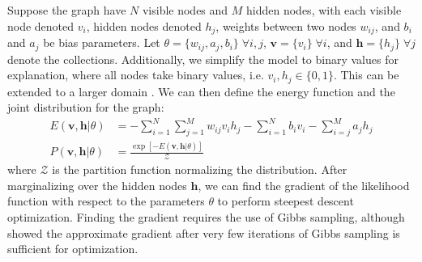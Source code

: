 \documentclass[12pt]{article}
\newcommand{\de}{\partial}
\begin{document}
Suppose the graph have $N$ visible nodes and $M$ hidden nodes,
with each visible node denoted $v_i$, hidden nodes denoted $h_j$, 
weights between two nodes $w_{ij}$,
and $b_i$ and $a_j$ be bias parameters.
Let $\theta = \{ w_{ij},a_j,b_i \} \; \forall i,j$,
$\mathbf{v} = \{v_i\} \; \forall i$,
and $\mathbf{h} = \{h_j\} \; \forall j$ denote the collections.
Additionally, we simplify the model to binary values for explanation, 
where all nodes take binary values, i.e. $v_i, h_j \in \{0,1\}$.
This can be extended to a larger domain \cite{SaMnHi07}.
We can then define the energy function and 
the joint distribution for the graph:
%
\begin{equation}
\begin{aligned}
    E(\mathbf{v},\mathbf{h}|\theta) &= 
        - \displaystyle\sum_{i=1}^N \displaystyle\sum_{j=1}^M
             w_{ij} v_i h_j 
        - \displaystyle\sum_{i=1}^N b_i v_i
        - \displaystyle\sum_{i=j}^M a_j h_j \\
%
%
    P(\mathbf{v},\mathbf{h}|\theta) &= 
        \frac{\exp\left[-E(\mathbf{v},\mathbf{h}|\theta)\right]}
        {\mathcal{Z}}
\end{aligned}
\end{equation}
%
where $\mathcal{Z}$ is the partition function normalizing
the distribution.
After marginalizing over the hidden nodes $\mathbf{h}$, 
we can find the gradient of the likelihood function
with respect to the parameters $\theta$
to perform steepest descent optimization.
Finding the gradient requires the use of Gibbs sampling,
although \cite{SaMnHi07} showed the approximate gradient
after very few iterations of Gibbs sampling is sufficient 
for optimization.
%
%
\end{document}

